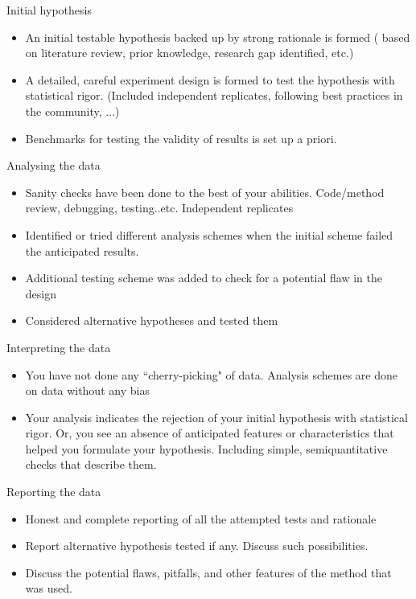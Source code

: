 \documentclass[9pt,lessons]{livecoms}
\theoremstyle{definition}
\theoremstyle{remark}
\begin{document}
\begin{Checklists*}[p!]

\begin{checklist}{Initial hypothesis}
\begin{itemize}
\item An initial testable hypothesis backed up by strong rationale is formed ( based on literature review, prior knowledge, research gap identified, etc.)
\item A detailed, careful experiment design is formed to test the hypothesis with statistical rigor.
(Included independent replicates, following best practices in the community, ...) 
\item Benchmarks for testing the validity of results is set up a priori.
\end{itemize}
\end{checklist}

\begin{checklist}{Analysing the data}
\begin{itemize}
\item Sanity checks have been done to the best of your abilities.
Code/method review, debugging, testing..etc. Independent replicates   
\item Identified or tried different analysis schemes when the initial scheme failed the anticipated results.
\item Additional testing scheme was added to check for a potential flaw in the design
\item Considered alternative hypotheses and tested them
\end{itemize}
\end{checklist}

\begin{checklist}{Interpreting the data}
\begin{itemize}
\item You have not done any ``cherry-picking" of data. Analysis schemes are done on data without any bias
\item Your analysis indicates the rejection of your initial hypothesis with statistical rigor.
Or, you see an absence of anticipated features or characteristics that helped you formulate your hypothesis.
Including simple, semiquantitative checks that describe them.
\end{itemize}
\end{checklist}

\begin{checklist}{Reporting the data}
\begin{itemize}
\item Honest and complete reporting of all the attempted tests and rationale
\item Report alternative hypothesis tested if any. Discuss such possibilities.
\item Discuss the potential flaws, pitfalls, and other features of the method that was used.
\end{itemize}
\end{checklist}

\end{Checklists*}
\end{document}
